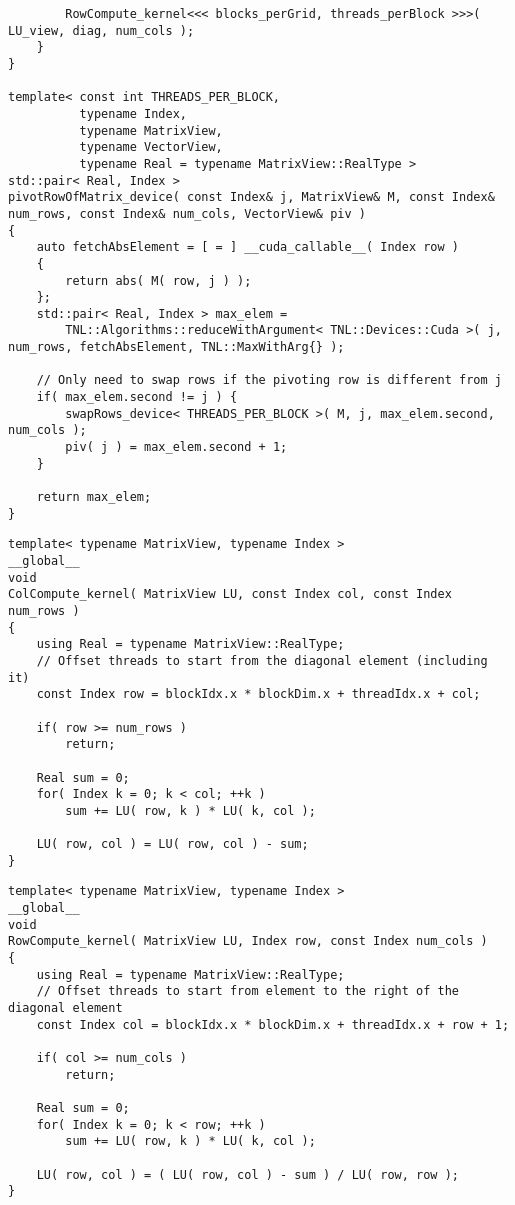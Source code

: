 \begin{lstlisting}
		RowCompute_kernel<<< blocks_perGrid, threads_perBlock >>>( LU_view, diag, num_cols );
	}
}

template< const int THREADS_PER_BLOCK,
		  typename Index,
		  typename MatrixView,
		  typename VectorView,
		  typename Real = typename MatrixView::RealType >
std::pair< Real, Index >
pivotRowOfMatrix_device( const Index& j, MatrixView& M, const Index& num_rows, const Index& num_cols, VectorView& piv )
{
	auto fetchAbsElement = [ = ] __cuda_callable__( Index row )
	{
		return abs( M( row, j ) );
	};
	std::pair< Real, Index > max_elem =
		TNL::Algorithms::reduceWithArgument< TNL::Devices::Cuda >( j, num_rows, fetchAbsElement, TNL::MaxWithArg{} );
	
	// Only need to swap rows if the pivoting row is different from j
	if( max_elem.second != j ) {
		swapRows_device< THREADS_PER_BLOCK >( M, j, max_elem.second, num_cols );
		piv( j ) = max_elem.second + 1;
	}
	
	return max_elem;
}
\end{lstlisting}

\begin{lstlisting}[caption={The implementation of the \code{ColCompute\_kernel()} kernel which computes one column of \code{LU}.},label={Listing:PCMxPP-implementation->kernels->column-compute-kernel}]
template< typename MatrixView, typename Index >
__global__
void
ColCompute_kernel( MatrixView LU, const Index col, const Index num_rows )
{
	using Real = typename MatrixView::RealType;
	// Offset threads to start from the diagonal element (including it)
	const Index row = blockIdx.x * blockDim.x + threadIdx.x + col;
	
	if( row >= num_rows )
		return;
	
	Real sum = 0;
	for( Index k = 0; k < col; ++k )
		sum += LU( row, k ) * LU( k, col );
	
	LU( row, col ) = LU( row, col ) - sum;
}
\end{lstlisting}

\begin{lstlisting}[caption={The implementation of the \code{RowCompute\_kernel()} kernel which computes one row of \code{LU}.},label={Listing:PCMxPP-implementation->kernels->row-compute-kernel}]
template< typename MatrixView, typename Index >
__global__
void
RowCompute_kernel( MatrixView LU, Index row, const Index num_cols )
{
	using Real = typename MatrixView::RealType;
	// Offset threads to start from element to the right of the diagonal element
	const Index col = blockIdx.x * blockDim.x + threadIdx.x + row + 1;
	
	if( col >= num_cols )
		return;
	
	Real sum = 0;
	for( Index k = 0; k < row; ++k )
		sum += LU( row, k ) * LU( k, col );
	
	LU( row, col ) = ( LU( row, col ) - sum ) / LU( row, row );
}
\end{lstlisting}






